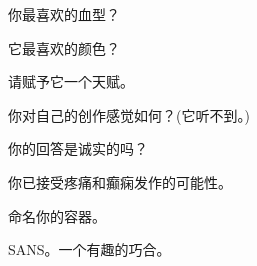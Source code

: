 \documentclass[12pt]{article}
\begin{document}
你最喜欢的血型？


它最喜欢的颜色？


请赋予它一个天赋。


你对自己的创作感觉如何？(它听不到。)


你的回答是诚实的吗？


你已接受疼痛和癫痫发作的可能性。


命名你的容器。

SANS。一个有趣的巧合。
\end{document}
